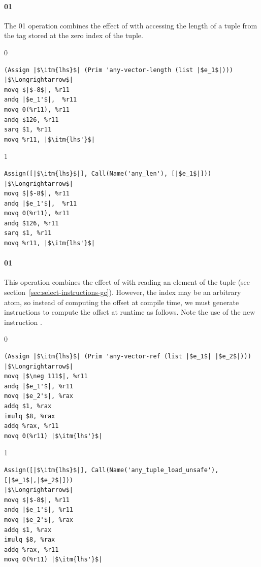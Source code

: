 \documentclass[7x10]{TimesAPriori_MIT}%
\def\racketEd{0}
\def\pythonEd{1}
\def\edition{1}
\newcommand{\racket}[1]{{\if\edition\racketEd{#1}\fi}}
\newcommand{\pythonColor}[0]{}
\newcommand{\python}[1]{{\if\edition\pythonEd\pythonColor #1\fi}}
\numberwithin{theorem}{chapter}
\numberwithin{definition}{chapter}
\numberwithin{equation}{chapter}
\begin{document}

\paragraph{\racket{}\python{}}

The \racket{\code{any-vector-length}}\python{}
operation combines the effect of  with accessing the
length of a tuple from the tag stored at the zero index of the tuple.

{\if\edition\racketEd
\begin{lstlisting}
(Assign |$\itm{lhs}$| (Prim 'any-vector-length (list |$e_1$|)))
|$\Longrightarrow$|
movq $|$-8$|, %r11
andq |$e_1'$|,  %r11
movq 0(%r11), %r11
andq $126, %r11
sarq $1, %r11
movq %r11, |$\itm{lhs'}$|
\end{lstlisting}
\fi}
{\if\edition\pythonEd\pythonColor
\begin{lstlisting}
Assign([|$\itm{lhs}$|], Call(Name('any_len'), [|$e_1$|]))
|$\Longrightarrow$|
movq $|$-8$|, %r11
andq |$e_1'$|,  %r11
movq 0(%r11), %r11
andq $126, %r11
sarq $1, %r11
movq %r11, |$\itm{lhs'}$|
\end{lstlisting}
\fi}

\paragraph{\racket{}\python{}}

This operation combines the effect of  with reading an
element of the tuple (see
section~\ref{sec:select-instructions-gc}). However, the index may be
an arbitrary atom, so instead of computing the offset at compile time,
we must generate instructions to compute the offset at runtime as
follows. Note the use of the new instruction .
\begin{center}
\begin{minipage}{0.96\textwidth}
{\if\edition\racketEd    
\begin{lstlisting}
(Assign |$\itm{lhs}$| (Prim 'any-vector-ref (list |$e_1$| |$e_2$|)))
|$\Longrightarrow$|
movq |$\neg 111$|, %r11
andq |$e_1'$|, %r11
movq |$e_2'$|, %rax
addq $1, %rax
imulq $8, %rax
addq %rax, %r11
movq 0(%r11) |$\itm{lhs'}$|
\end{lstlisting}
\fi}
%
{\if\edition\pythonEd\pythonColor    
\begin{lstlisting}
Assign([|$\itm{lhs}$|], Call(Name('any_tuple_load_unsafe'), [|$e_1$|,|$e_2$|]))
|$\Longrightarrow$|
movq $|$-8$|, %r11
andq |$e_1'$|, %r11
movq |$e_2'$|, %rax
addq $1, %rax
imulq $8, %rax
addq %rax, %r11
movq 0(%r11) |$\itm{lhs'}$|
\end{lstlisting}
\fi}
\end{minipage}
\end{center}
\end{document}
